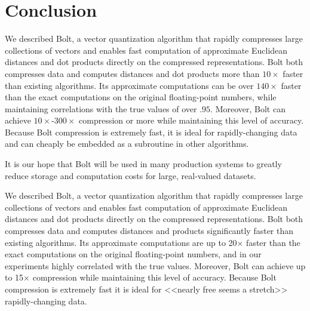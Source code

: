 \documentclass[sigconf]{acmart}  %
\begin{document}
\section{Conclusion} \label{sec:conclusion}



We described Bolt, a vector quantization algorithm that rapidly compresses large collections of vectors and enables fast computation of approximate Euclidean distances and dot products directly on the compressed representations. Bolt both compresses data and computes distances and dot products more than $10\times$ faster than existing algorithms. Its approximate computations can be over $140\times$ faster than the exact computations on the original floating-point numbers, while maintaining correlations with the true values of over $.95$. Moreover, Bolt can achieve $10\times$-$300\times$ compression or more while maintaining this level of accuracy. Because Bolt compression is extremely fast, it is ideal for rapidly-changing data and can cheaply be embedded as a subroutine in other algorithms.

It is our hope that Bolt will be used in many production systems to greatly reduce storage and computation costs for large, real-valued datasets.


We described Bolt, a vector quantization algorithm that rapidly compresses large collections of vectors and enables fast computation of approximate Euclidean distances and dot products directly on the compressed representations. Bolt both compresses data and computes distances and products significantly faster than existing algorithms. Its approximate computations are up to 20× faster than the exact computations on the original floating-point numbers, and in our experiments highly correlated with the true values. Moreover, Bolt can achieve up to 15× compression while maintaining this level of accuracy. Because Bolt compression is extremely fast it is ideal for  <<nearly free seems a stretch>> rapidly-changing data.
\end{document}
